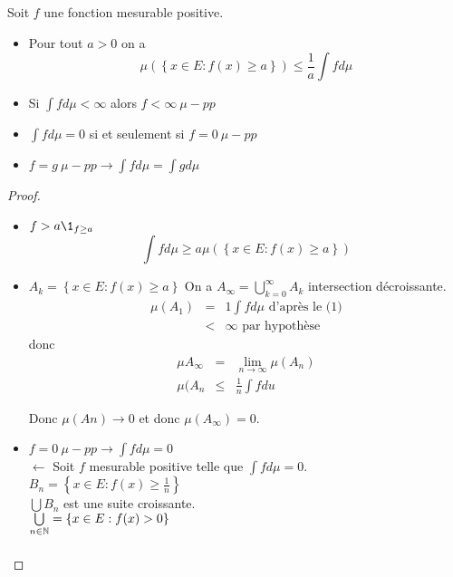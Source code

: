 \begin{prop}
	Soit $f$ une fonction mesurable positive.
	\begin{itemize}
		\item Pour tout $a > 0$ on a
		      $$ \mu\left(\left\{ x \in E : f(x) \geq a \right\}\right) \leq \frac{1}{a} \int f d\mu $$
		\item Si $\int f d\mu < \infty$ alors $f < \infty \ \mu-pp$
		\item $\int f d\mu = 0$ si et seulement si $f = 0 \ \mu-pp$
		\item $f=g \ \mu-pp \rightarrow \int f d\mu = \int g d\mu$
	\end{itemize}
\end{prop}

\begin{proof}
	\begin{itemize}
		\item $f > a \1_{f \geq a}$
		      $$\int f d \mu \geq a \mu \left( \left\{ x \in E : f(x) \geq a \right\} \right) $$
		\item $A_k = \left\{ x \in E : f(x) \geq a \right\}$
		      On a $A_{\infty} = \bigcup_{k=0}^{\infty} A_k$ intersection décroissante.
		      \begin{eqnarray*}
			      \mu(A_1) &=& 1 \int f d \mu \text{ d'après  le (1)}\\
			      &<& \infty \text{ par hypothèse}
		      \end{eqnarray*}
		      donc \begin{eqnarray*}
			      \mu {A_{\infty}} &=& \lim\limits_{n \to \infty} \mu(A_n) \\
			      \mu(A_{n} &\leq& \frac{1}{n} \int f d u
		      \end{eqnarray*}

		      Donc $\mu (An) \to 0$ et donc $\mu(A_{\infty}) = 0$.
		\item $f= 0 \ \mu-pp \rightarrow \int f d\mu = 0$ \\ %
		      $\leftarrow$ Soit  $f$ mesurable positive telle que $\int f d\mu = 0$.\\
		      $B_n = \left\{ x \in E : f(x) \geq \frac{1}{n} \right\}$\\
		      $\bigcup B_n$ est une suite croissante. \\
		      $\bigcup\limits_{n \in \mathbb{N}} = \left\{ x \in E : f(x) > 0 \right\}$\\

		      \begin{eqnarray*} %
		      \end{eqnarray*}

	\end{itemize}
\end{proof}



